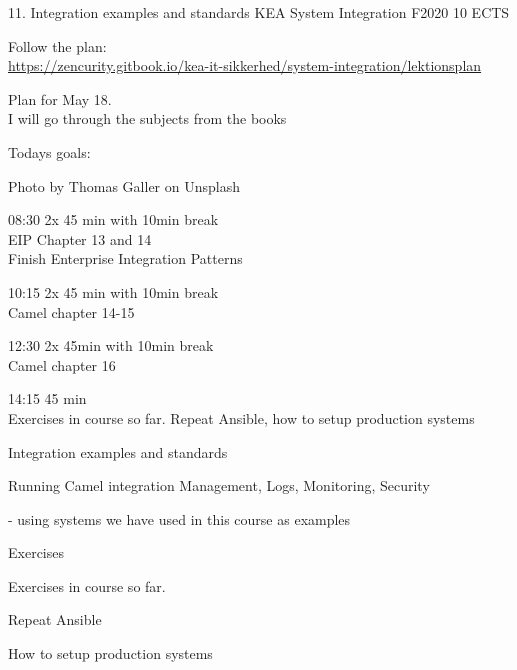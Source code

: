 \documentclass[Screen16to9,17pt]{foils}
\begin{document}
\mytitlepage
{11. Integration examples and standards}
{KEA System Integration F2020 10 ECTS}



\begin{list2}
\item Follow the plan:\\
\url{https://zencurity.gitbook.io/kea-it-sikkerhed/system-integration/lektionsplan}
\item Plan for May 18.\\
I will go through the subjects from the books
\item
\end{list2}



Todays goals:
\begin{list2}
\item
\end{list2}

Photo by Thomas Galler on Unsplash


\begin{list2}
\item 08:30 2x 45 min with 10min break\\
EIP Chapter 13 and 14\\
Finish Enterprise Integration Patterns
\item 10:15 2x 45 min with 10min break\\
Camel chapter 14-15
\item 12:30 2x 45min with 10min break \\
Camel chapter 16
\item 14:15 45 min\\
Exercises in course so far. Repeat Ansible, how to setup production systems
\end{list2}





\begin{list2}
\item Integration examples and standards
\item Running Camel integration Management, Logs, Monitoring, Security
\item - using systems we have used in this course as examples
\end{list2}

Exercises
\begin{list2}
\item Exercises in course so far.
\item Repeat Ansible
\item How to setup production systems
\end{list2}
\end{document}
